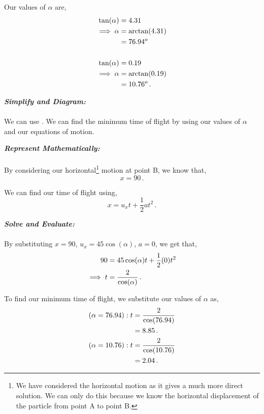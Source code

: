 \begin{subquestions}
\begin{subsubquestions}
Our values of $\alpha$ are,
\begin{align}
	\tan(\alpha) & = 4.31 \nonumber \\
	\implies \alpha & = \arctan(4.31) \nonumber \\
	                & = 76.94^o \\ \nonumber \\
	\tan(\alpha) & = 0.19 \nonumber \\
	\implies \alpha & = \arctan(0.19) \nonumber \\
					& = 10.76^o \,.
\end{align}
	

\subsubquestion

\textbf{\textit{Simplify and Diagram:}} \\ \\
We can use . We can find the minimum time of flight by using our values of $\alpha$ and our equations of motion.




\textbf{\textit{Represent Mathematically:}} \\ \\
By considering our horizontal\footnote{We have considered the horizontal motion as it gives a much more direct solution. We can only do this because we know the horizontal displacement of the particle from point A to point B.} motion at point B, we know that,
\begin{equation}
	x=90 \,.
\end{equation} 

We can find our time of flight using,
\begin{equation}
	x = u_xt + \frac{1}{2}at^2 \,.	
\end{equation}




\textbf{\textit{Solve and Evaluate:}} \\ \\
By substituting $x=90$, $u_x=45\cos(\alpha)$, $a=0$, we get that,
\begin{align}
	90 & = 45\cos(\alpha)t + \frac{1}{2}(0)t^2 \nonumber \\
	\implies t & = \frac{2}{\cos(\alpha)} \,.
\end{align}

To find our minimum time of flight, we substitute our values of $\alpha$ as,
\begin{align}
	(\alpha=76.94): t & = \frac{2}{\cos(76.94)} \nonumber \\
	                  & = 8.85 \,. \\
	(\alpha=10.76): t & = \frac{2}{\cos(10.76)} \nonumber \\
					  & = 2.04 \,. \\	                  
\end{align}


\end{subsubquestions}
\end{subquestions}
